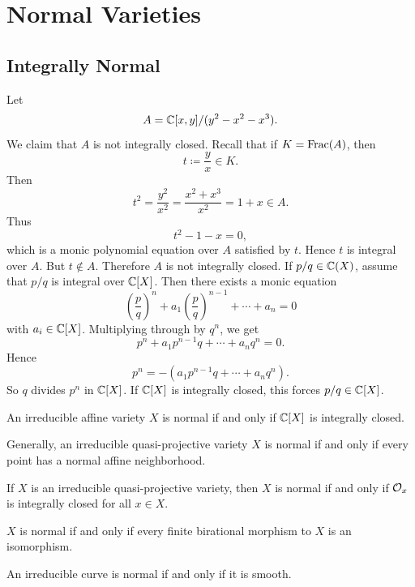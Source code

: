 
\section{Normal Varieties}

\subsection{Integrally Normal}

Let
\[
    A = \mathbb{C}[x,y]/(y^2 - x^2 - x^3).
\]
We claim that $A$ is not integrally closed.
Recall that if $K = \mathrm{Frac}(A)$, then
\[
    t \coloneqq \frac{y}{x}\in K.
\]
Then
\[
    t^2 = \frac{y^2}{x^2} = \frac{x^2 + x^3}{x^2} = 1 + x \in A.
\]
Thus
\[
    t^2 - 1 - x = 0,
\]
which is a monic polynomial equation over $A$ satisfied by $t$.
Hence $t$ is integral over $A$.
But $t \notin A$.
Therefore $A$ is not integrally closed.
If $p/q \in \mathbb{C}(X)$, assume that $p/q$ is integral over $\mathbb{C}[X]$.
Then there exists a monic equation
\[
    \left(\frac{p}{q}\right)^n + a_1\left(\frac{p}{q}\right)^{n-1} + \cdots + a_n = 0
\]
with $a_i \in \mathbb{C}[X]$.
Multiplying through by $q^n$, we get
\[
    p^n + a_1 p^{n-1}q + \cdots + a_n q^n = 0.
\]
Hence
\[
    p^n = -\left(a_1 p^{n-1}q + \cdots + a_n q^n\right).
\]
So $q$ divides $p^n$ in $\mathbb{C}[X]$.
If $\mathbb{C}[X]$ is integrally closed, this forces $p/q \in \mathbb{C}[X]$.

\begin{definition}[Normal]
    An irreducible affine variety $X$ is normal if and only if $\mathbb{C}[X]$ is integrally closed.
\end{definition}

Generally, an irreducible quasi-projective variety $X$ is normal if and only if every point has a normal affine neighborhood.

\begin{lemma*}{
    If $X$ is an irreducible quasi-projective variety, then $X$ is normal if and only if $\mathcal{O}_x$ is integrally closed for all $x\in X$.
}
\end{lemma*}

\begin{lemma}{
    $X$ is normal if and only if every finite birational morphism to $X$ is an isomorphism.
}
\end{lemma}

\begin{theorem*}{
    An irreducible curve is normal if and only if it is smooth.
}
\end{theorem*}

